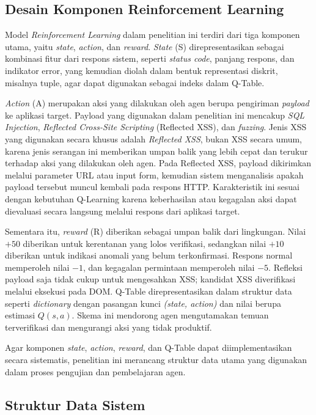\subsection{Desain Komponen Reinforcement Learning}

Model \textit{Reinforcement Learning} dalam penelitian ini terdiri dari tiga komponen utama, yaitu \textit{state}, \textit{action}, dan \textit{reward}. \textit{State} (S) direpresentasikan sebagai kombinasi fitur dari respons sistem, seperti \textit{status code}, panjang respons, dan indikator error, yang kemudian diolah dalam bentuk representasi diskrit, misalnya tuple, agar dapat digunakan sebagai indeks dalam Q-Table.

\textit{Action} (A) merupakan aksi yang dilakukan oleh agen berupa pengiriman \textit{payload} ke aplikasi target. Payload yang digunakan dalam penelitian ini mencakup \textit{SQL Injection}, \textit{Reflected Cross-Site Scripting} (Reflected XSS), dan \textit{fuzzing}. Jenis XSS yang digunakan secara khusus adalah \textit{Reflected XSS}, bukan XSS secara umum, karena jenis serangan ini memberikan umpan balik yang lebih cepat dan terukur terhadap aksi yang dilakukan oleh agen. Pada Reflected XSS, payload dikirimkan melalui parameter URL atau input form, kemudian sistem menganalisis apakah payload tersebut muncul kembali pada respons HTTP. Karakteristik ini sesuai dengan kebutuhan Q-Learning karena keberhasilan atau kegagalan aksi dapat dievaluasi secara langsung melalui respons dari aplikasi target.

Sementara itu, \textit{reward} (R) diberikan sebagai umpan balik dari lingkungan. Nilai $+50$ diberikan untuk kerentanan yang lolos verifikasi, sedangkan nilai $+10$ diberikan untuk indikasi anomali yang belum terkonfirmasi. Respons normal memperoleh nilai $-1$, dan kegagalan permintaan memperoleh nilai $-5$. Refleksi payload saja tidak cukup untuk mengesahkan XSS; kandidat XSS diverifikasi melalui eksekusi pada DOM. Q-Table direpresentasikan dalam struktur data seperti \textit{dictionary} dengan pasangan kunci \textit{(state, action)} dan nilai berupa estimasi $Q(s,a)$. Skema ini mendorong agen mengutamakan temuan terverifikasi dan mengurangi aksi yang tidak produktif.

Agar komponen \textit{state}, \textit{action}, \textit{reward}, dan Q-Table dapat diimplementasikan secara sistematis, penelitian ini merancang struktur data utama yang digunakan dalam proses pengujian dan pembelajaran agen.

\subsection{Struktur Data Sistem}

